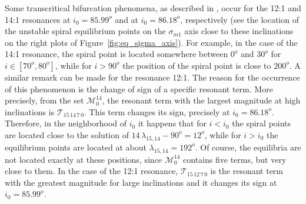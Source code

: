 \documentclass[12pt,reqno]{amsart}
\numberwithin{equation}{section}
\begin{document}
Some transcritical bifurcation phenomena, as described in \cite{CGmajor,CGminor}, occur for the 12:1 and 14:1 resonances at
$i_0=85.99^o$ and at $i_0=86.18^o$, respectively (see the location of the unstable spiral equilibrium points on the $\sigma_{m1}$ axis close to these inclinations on the right plots of Figure~\ref{fig:eq_sigma_axis}). For example, in the case of the 14:1 resonance, the spiral point is located somewhere between $0^o$ and $30^o$ for $i \in [70^o , 80^o]$, while for $i>90^o$ the position of the spiral point is close to $200^o$. A similar remark can be made for the  resonance 12:1. The reason for the occurrence of this phenomenon is the change of sign of a specific resonant term. More precisely, from the set
$\mathcal{M}_0^{14}$, the resonant term with the largest magnitude  at high inclinations is $\mathcal{T}_{1\!5 \, 1\!4\,7\,0}$. This term changes its sign, precisely at $i_0=86.18^o$.
Therefore, in the neighborhood of $i_0$ it happens that for $i<i_0$ the spiral points are located
close to the solution of $14\, \lambda_{15,14} -90^o = 12^o$, while for $i>i_0$ the equilibrium points
are located at about $\lambda_{15,14}=192^o$. Of course, the equilibria are not located exactly at these positions,
since $\mathcal{M}_0^{14}$ contains five terms, but very close to them. In the case of the 12:1 resonance,
$\mathcal{T}_{1\!5 \, 1\!2\,7\,0}$ is the resonant term with the greatest magnitude for large inclinations and it changes its sign at $i_0=85.99^o$.
\end{document}
